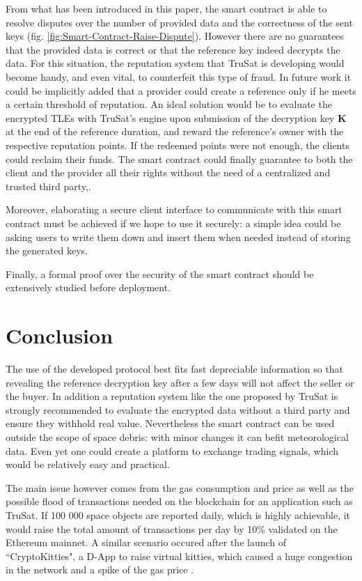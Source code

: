 \documentclass[conference]{IEEEtran}
\begin{document}
From what has been introduced in this paper, the smart contract is able to resolve disputes over the number of provided data and the correctness of the sent keys (fig. \ref{fig:Smart-Contract-Raise-Dispute}). However there are no guarantees that the provided data is correct or that the reference key indeed decrypts the data. For this situation, the reputation system that TruSat is developing would become handy, and even vital, to counterfeit this type of fraud. In future work it could be implicitly added that a provider could create a reference only if he meets a certain threshold of reputation. An ideal solution would be to evaluate the encrypted TLEs with TruSat's engine upon submission of the decryption key \textbf{K} at the end of the reference duration, and reward the reference's owner with the respective reputation points. If the redeemed points were not enough, the clients could reclaim their funds.  The smart contract could finally guarantee to both the client and the provider all their rights without the need of a centralized and trusted third party,.

Moreover, elaborating a secure client interface to communicate with this smart contract must be achieved if we hope to use it securely: a simple idea could be asking users to write them down and insert them when needed instead of storing the generated keys.

Finally, a formal proof over the security of the smart contract should be extensively studied before deployment.


\section{Conclusion}
The use of the developed protocol best fits fast depreciable information so that revealing the reference decryption key after a few days will not affect the seller or the buyer. In addition a reputation system like the one proposed by TruSat is strongly recommended to evaluate the encrypted data without a third party and ensure they withhold real value. Nevertheless the smart contract can be used outside the scope of space debris: with minor changes it can befit meteorological data. Even yet one could create a platform to exchange trading signals, which would be relatively easy and practical. 

The main issue however comes from the gas consumption and price as well as the possible flood of transactions needed on the blockchain for an application such as TruSat. If 100 000 space objects are reported daily, which is highly achievable, it would raise the total amount of transactions per day by 10\% validated on the Ethereum mainnet. A similar scenario occured after the launch of ``CryptoKitties", a D-App to raise virtual kitties, which caused a huge congestion in the network and a spike of the gas price \cite{Kitties}.
\end{document}
